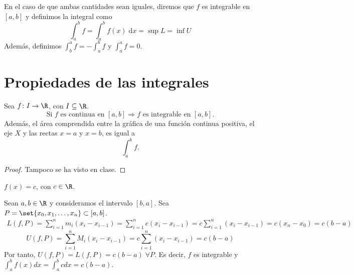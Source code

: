 En el caso de que ambas cantidades sean iguales, diremos que \(f \) es integrable en \([a,b ]\) y definimos la integral como
\[
	\int^{b}_{a} f = \int^{b}_{a} f(x) \; \mathrm{d} x = \sup L = \inf U
\]
Además, definimos \(\int^{a}_b f = - \int^{b}_{a} f \) y \(\int^{a}_{a} f =0 \).

\vspace{1.5cm}
\section{Propiedades de las integrales}
\begin{theorem}
	Sea \(f\colon I \to \R\), con \(I \subseteq \R\).
	\[
		\text{Si } f \text{ es continua en } [a,b] \Rightarrow f \text{ es integrable en } [a,b].
	\]
	Además, el área comprendida entre la gráfica de una función continua positiva, el eje \(X \) y las rectas \(x = a \) y \(x = b\), es igual a
	\[
		\int^{b}_{a} f.
	\]
\end{theorem}
\begin{proof}
	Tampoco se ha visto en clase.
\end{proof}
\begin{example}
	\(f(x) = c \), con \(c \in \R\).

	Sean \(a,b \in \R \) y consideramos el intervalo \([b,a ]\). Sea \(P = \set{x_0, x_1, \ldots, x_n } \subset [a,b]\).
	\begin{multline*}
		L (f, P) = \sum_{i=1}^{n } m_i (x_i - x_{i-1}) = \sum_{i=1}^{n } c(x_i - x_{i-1}) = c \sum_{i=1}^{n } (x_i - x_{i-1}) = c (x_n - x_0) = c (b-a)
	\end{multline*}
	\[
		U(f, P) = \sum_{i=1}^{n } M_i (x_i - x_{i-1}) = c \sum_{i=1}^{n } (x_i - x_{i-1}) = c(b-a)
	\]
	Por tanto, \(U(f,P) = L(f,P) = c(b-a ) \; \forall P\). Es decir, \(f \) es integrable y \(\int^{b}_{a} f(x)dx = \int^{b}_a c dx  = c(b-a) \).
	\begin{figure}[H]
		\centering
	\end{figure}
\end{example}
